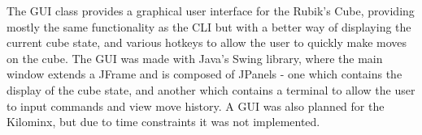 The GUI class provides a graphical user interface for the Rubik's Cube, providing mostly the same functionality as the CLI but with a better way of displaying the current cube state, and various hotkeys to allow the user to quickly make moves on the cube. The GUI was made with Java's Swing library, where the main window extends a JFrame and is composed of JPanels - one which contains the display of the cube state, and another which contains a terminal to allow the user to input commands and view move history. A GUI was also planned for the Kilominx, but due to time constraints it was not implemented.